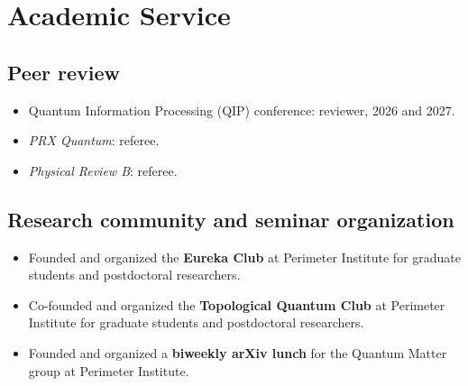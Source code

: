 \documentclass[10pt,letterpaper]{article}
\begin{document}
\section{Academic Service}
\subsection{Peer review}
\begin{itemize}
\item Quantum Information Processing (QIP) conference: reviewer, 2026 and 2027.
\item \textit{PRX Quantum}: referee.
\item \textit{Physical Review B}: referee.
\end{itemize}

\subsection{Research community and seminar organization}
\begin{itemize}
\item Founded and organized the \textbf{Eureka Club} at Perimeter Institute for graduate students and postdoctoral researchers.
\item Co-founded and organized the \textbf{Topological Quantum Club} at Perimeter Institute for graduate students and postdoctoral researchers.
\item Founded and organized a \textbf{biweekly arXiv lunch} for the Quantum Matter group at Perimeter Institute.
\end{itemize}
\end{document}
